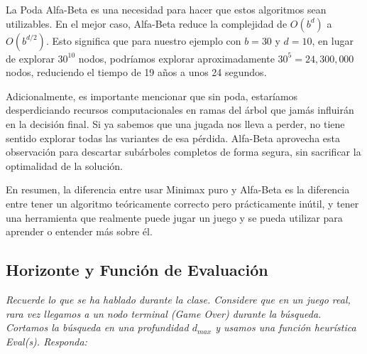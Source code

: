 \documentclass[11pt]{article}
\begin{document}
\begin{itemize}[leftmargin=*, itemsep=0.8em]
	      La Poda Alfa-Beta es una necesidad para hacer que estos algoritmos sean utilizables. En el mejor caso, Alfa-Beta
	      reduce la complejidad de $O(b^d)$ a $O(b^{d/2})$. Esto significa que para nuestro ejemplo con $b=30$ y $d=10$,
	      en lugar de explorar $30^{10}$ nodos, podríamos explorar aproximadamente $30^5 = 24,300,000$ nodos, reduciendo
	      el tiempo de 19 años a unos 24 segundos.

	      Adicionalmente, es importante mencionar que sin poda, estaríamos desperdiciando recursos computacionales en
	      ramas del árbol que jamás influirán en la decisión final. Si ya sabemos que una jugada nos lleva a perder,
	      no tiene sentido explorar todas las variantes de esa pérdida. Alfa-Beta aprovecha esta observación para descartar
	      subárboles completos de forma segura, sin sacrificar la optimalidad de la solución.

	      En resumen, la diferencia entre usar Minimax puro y Alfa-Beta es la diferencia entre tener un algoritmo
	      teóricamente correcto pero prácticamente inútil, y tener una herramienta que realmente puede jugar un juego
	      y se pueda utilizar para aprender o entender más sobre él.

\end{itemize}

\subsection*{Horizonte y Función de Evaluación}

\textit{Recuerde lo que se ha hablado durante la clase. Considere que en un juego real, rara vez llegamos a un nodo
	terminal (Game Over) durante la búsqueda. Cortamos la búsqueda en una profundidad $d_{max}$ y usamos una
	función heurística Eval(s). Responda:}
\end{document}
